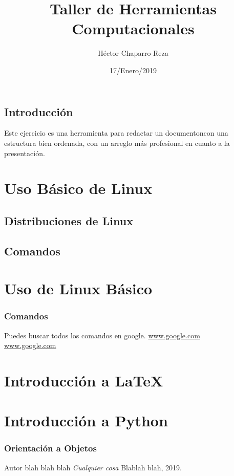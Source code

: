\documentclass{book}
\title{Taller de Herramientas Computacionales}
\author{Héctor Chaparro Reza}
\date{17/Enero/2019}
\begin{document}
\maketitle
\tableofcontents
\section*{Introducción} Este ejercicio es una herramienta para redactar un documentoncon una estructura bien ordenada, con un arreglo más profesional en cuanto a la presentación.
\chapter{Uso Básico de Linux}
\section{Distribuciones de Linux}
\section{Comandos}


\chapter{Uso de Linux Básico}
\subsection*{Comandos}
Puedes buscar todos los comandos en google.
\url{www.google.com}\\
\hyperref[google]{www.google.com}
\chapter{Introducción a LaTeX}
\chapter{Introducción a Python}
\subsection*{Orientación a  Objetos}


\begin{thebibliography}{9}
Autor blah blah blah
\textit{Cualquier cosa}
Blablah blah, 2019.
\end{thebibliography}
\end{document}
